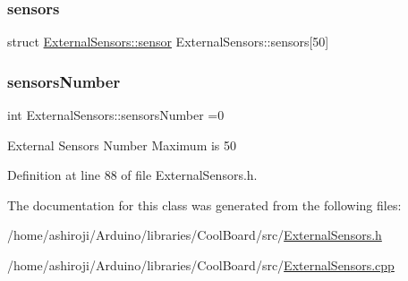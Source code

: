 \subsubsection{\texorpdfstring{sensors}{sensors}}
{\footnotesize\ttfamily struct \hyperlink{struct_external_sensors_1_1sensor}{External\+Sensors\+::sensor} External\+Sensors\+::sensors\mbox{[}50\mbox{]}\hspace{0.3cm}{\ttfamily [private]}}

\mbox{\label{class_external_sensors_a58e4fbf9adeae787d92be5fa33043b5d}} 
\subsubsection{\texorpdfstring{sensors\+Number}{sensorsNumber}}
{\footnotesize\ttfamily int External\+Sensors\+::sensors\+Number =0\hspace{0.3cm}{\ttfamily [private]}}

External Sensors Number Maximum is 50 

Definition at line 88 of file External\+Sensors.\+h.



The documentation for this class was generated from the following files\+:\begin{DoxyCompactItemize}
\item 
/home/ashiroji/\+Arduino/libraries/\+Cool\+Board/src/\hyperlink{_external_sensors_8h}{External\+Sensors.\+h}\item 
/home/ashiroji/\+Arduino/libraries/\+Cool\+Board/src/\hyperlink{_external_sensors_8cpp}{External\+Sensors.\+cpp}\end{DoxyCompactItemize}
